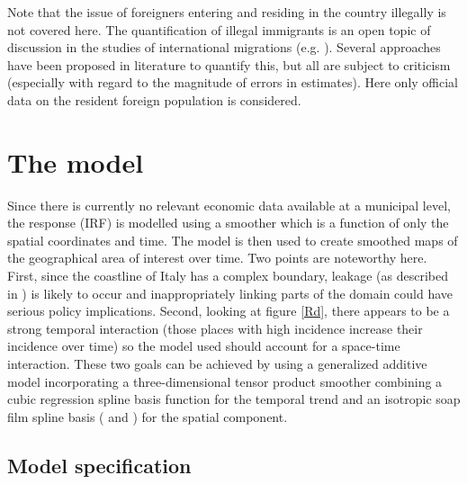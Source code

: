 Note that the issue of foreigners entering and residing in the country illegally is not covered here. The quantification of illegal immigrants is an open topic of discussion in the studies of international migrations (e.g. \cite{Strozza2004}). Several approaches have been proposed in literature to quantify this, but all are subject to criticism (especially with regard to the magnitude of errors in estimates). Here only official data on the resident foreign population is considered.

\section{The model \label{METH}}

Since there is currently no relevant economic data available at a municipal level, the response (IRF) is modelled using a smoother which is a function of only the spatial coordinates and time. The model is then used to create smoothed maps of the geographical area of interest over time. Two points are noteworthy here. First, since the coastline of Italy has a complex boundary, leakage (as described in ) is likely to occur and inappropriately linking parts of the domain could have serious policy implications. Second, looking at figure \ref{Rd}, there appears to be a strong temporal interaction (those places with high incidence increase their incidence over time) so the model used should account for a space-time interaction. These two goals can be achieved by using a generalized additive model incorporating a three-dimensional tensor product smoother combining a cubic regression spline basis function for the temporal trend and an isotropic soap film spline basis (\cite{soap} and ) for the spatial component.

\subsection{Model specification \label{MS}}

